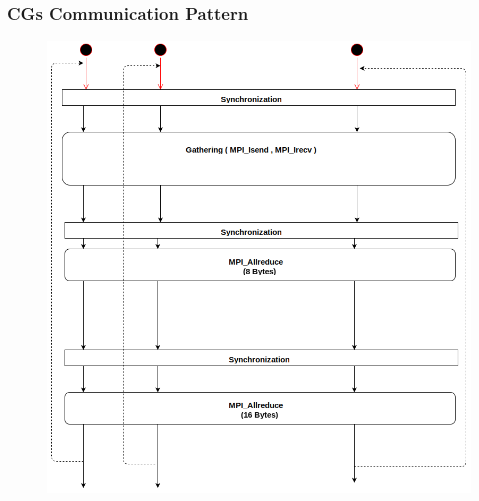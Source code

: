 \documentclass{beamer}
\begin{document}
\begin{frame}
\frametitle{CGs Communication Pattern}

\begin{figure}
\includegraphics[height=.9\textheight, keepaspectratio]{cg.jpg}
\end{figure}

\end{frame}
\end{document}
